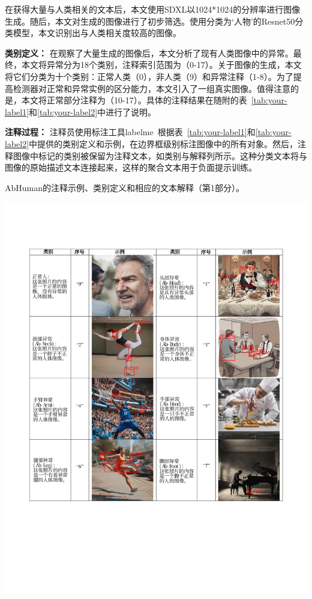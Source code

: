 在获得大量与人类相关的文本后，本文使用SDXL以1024*1024的分辨率进行图像生成。随后，本文对生成的图像进行了初步筛选。使用分类为‘人物’的Resnet50分类模型，本文识别出与人类相关度较高的图像。

\textbf{类别定义：}
在观察了大量生成的图像后，本文分析了现有人类图像中的异常。最终，本文将异常分为18个类别，注释索引范围为（0-17）。关于图像的生成，本文将它们分类为十个类别：正常人类（0），非人类（9）和异常注释（1-8）。为了提高检测器对正常和异常实例的区分能力，本文引入了一组真实图像。值得注意的是，本文将正常部分注释为（10-17）。具体的注释结果在随附的表~\ref{tab:your-label1}和\ref{tab:your-label2}中进行了说明。

\textbf{注释过程：}
注释员使用标注工具labelme~\cite{labelme}根据表~\ref{tab:your-label1}和\ref{tab:your-label2}中提供的类别定义和示例，在边界框级别标注图像中的所有对象。然后，注释图像中标记的类别被保留为注释文本，如类别与解释列所示。这种分类文本将与图像的原始描述文本连接起来，这样的聚合文本用于负面提示训练。

\begin{table}[ht]
    \centering
        \caption{AbHuman的注释示例、类别定义和相应的文本解释（第1部分）。}
    \includegraphics[width=\textwidth]{fig/Page1.pdf}
    \label{tab:your-label1} 
\end{table}

